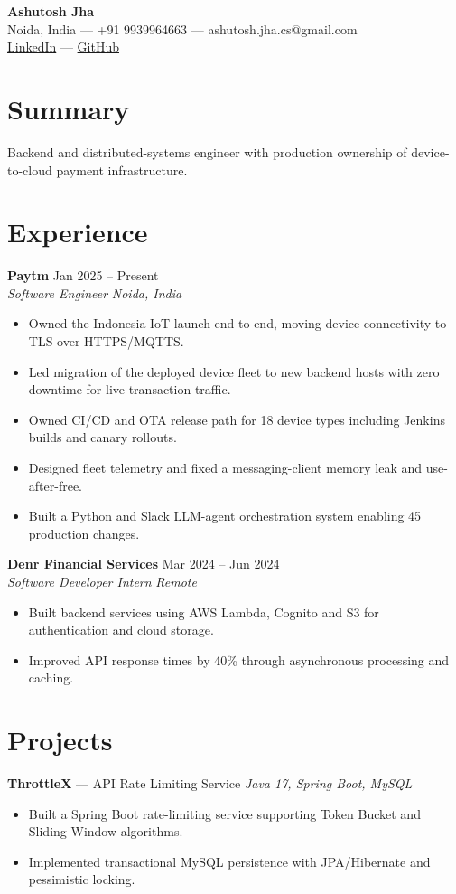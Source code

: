 \documentclass[a4paper,9pt]{article}
\newcommand{\role}[4]{%
  \textbf{#1} \hfill #2 \\
  \textit{#3} \hfill \textit{#4}\par\vspace{2pt}}
\begin{document}
\begin{center}
  {\LARGE \textbf{Ashutosh Jha}} \\
  Noida, India --- +91 9939964663 --- ashutosh.jha.cs@gmail.com \\
  \href{https://linkedin.com/in/thealonemusk}{LinkedIn} ---
  \href{https://github.com/thealonemusk}{GitHub}
\end{center}

\section{Summary}
Backend and distributed-systems engineer with production ownership of device-to-cloud payment infrastructure.

\section{Experience}
\role{Paytm}{Jan 2025 -- Present}{Software Engineer}{Noida, India}
\begin{itemize}
  \item Owned the Indonesia IoT launch end-to-end, moving device connectivity to TLS over HTTPS/MQTTS.
  \item Led migration of the deployed device fleet to new backend hosts with zero downtime for live transaction traffic.
  \item Owned CI/CD and OTA release path for 18 device types including Jenkins builds and canary rollouts.
  \item Designed fleet telemetry and fixed a messaging-client memory leak and use-after-free.
  \item Built a Python and Slack LLM-agent orchestration system enabling 45 production changes.
\end{itemize}

\role{Denr Financial Services}{Mar 2024 -- Jun 2024}{Software Developer Intern}{Remote}
\begin{itemize}
  \item Built backend services using AWS Lambda, Cognito and S3 for authentication and cloud storage.
  \item Improved API response times by 40\% through asynchronous processing and caching.
\end{itemize}

\section{Projects}
\textbf{ThrottleX} --- API Rate Limiting Service \hfill \textit{Java 17, Spring Boot, MySQL}
\begin{itemize}
  \item Built a Spring Boot rate-limiting service supporting Token Bucket and Sliding Window algorithms.
  \item Implemented transactional MySQL persistence with JPA/Hibernate and pessimistic locking.
\end{itemize}
\end{document}

